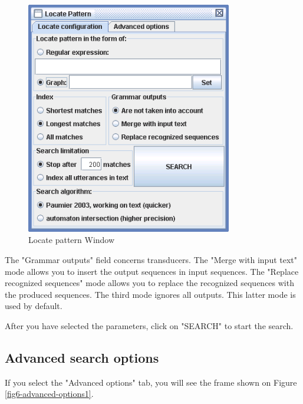 \bigskip
\begin{figure}[!h]
\begin{center}
\includegraphics[width=9cm]{resources/img/fig6-30.png}
\caption{Locate pattern Window\label{fig-regexp-frame}}
\end{center}
\end{figure}

\noindent The "Grammar outputs" field concerns transducers. The "Merge with
input text" mode allows you to insert the output sequences in input sequences.
The "Replace recognized sequences" mode allows you to replace the 
recognized sequences with the produced sequences. The third mode ignores all
outputs. This latter mode is used by default.

\bigskip
\noindent
After you have selected the parameters, click on "SEARCH" to start the search.

\clearpage
\subsection{Advanced search options}
\label{section-advanced-search-options}
If you select the "Advanced options" tab, you will see the frame shown on
Figure \ref{fig6-advanced-options1}.

